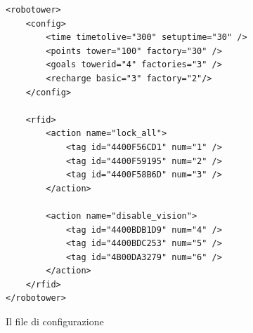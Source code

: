 \begin{figure}[h]
{
\begin{lstlisting}
<robotower>
	<config>
		<time timetolive="300" setuptime="30" />
		<points tower="100" factory="30" />
		<goals towerid="4" factories="3" />
		<recharge basic="3" factory="2"/>
	</config>

	<rfid>
		<action name="lock_all">
			<tag id="4400F56CD1" num="1" />
			<tag id="4400F59195" num="2" />
			<tag id="4400F58B6D" num="3" />
		</action>
      
		<action name="disable_vision">
			<tag id="4400BDB1D9" num="4" />
			<tag id="4400BDC253" num="5" />
			<tag id="4B00DA3279" num="6" />
		</action>
	</rfid>
</robotower>
\end{lstlisting}
}
\caption{Il file di configurazione}
\label{fig:configfile}
\end{figure}

